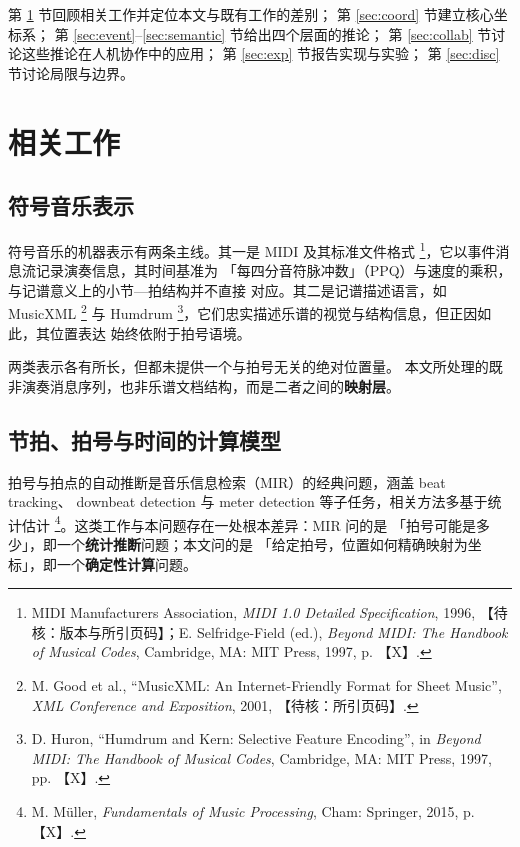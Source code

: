 \documentclass[11pt,a4paper,fontset=none]{ctexart}
\begin{document}
第 \ref{sec:related} 节回顾相关工作并定位本文与既有工作的差别；
第 \ref{sec:coord} 节建立核心坐标系；
第 \ref{sec:event}--\ref{sec:semantic} 节给出四个层面的推论；
第 \ref{sec:collab} 节讨论这些推论在人机协作中的应用；
第 \ref{sec:exp} 节报告实现与实验；
第 \ref{sec:disc} 节讨论局限与边界。

\section{相关工作}
\label{sec:related}
\subsection{符号音乐表示}

符号音乐的机器表示有两条主线。其一是 MIDI 及其标准文件格式
\footnote{MIDI Manufacturers Association, \emph{MIDI 1.0 Detailed Specification}, 1996, 【待核：版本与所引页码】；E. Selfridge-Field (ed.), \emph{Beyond MIDI: The Handbook of Musical Codes}, Cambridge, MA: MIT Press, 1997, p. 【X】.}，它以事件消息流记录演奏信息，其时间基准为
「每四分音符脉冲数」（PPQ）与速度的乘积，与记谱意义上的小节—拍结构并不直接
对应。其二是记谱描述语言，如 MusicXML \footnote{M. Good et al., “MusicXML: An Internet-Friendly Format for Sheet Music”, \emph{XML Conference and Exposition}, 2001, 【待核：所引页码】.} 与 Humdrum
\footnote{D. Huron, “Humdrum and Kern: Selective Feature Encoding”, in \emph{Beyond MIDI: The Handbook of Musical Codes}, Cambridge, MA: MIT Press, 1997, pp. 【X】.}，它们忠实描述乐谱的视觉与结构信息，但正因如此，其位置表达
始终依附于拍号语境。

\begin{注记}
两类表示各有所长，但都未提供一个与拍号无关的绝对位置量。
本文所处理的既非演奏消息序列，也非乐谱文档结构，而是二者之间的\textbf{映射层}。
\end{注记}

\subsection{节拍、拍号与时间的计算模型}

拍号与拍点的自动推断是音乐信息检索（MIR）的经典问题，涵盖 beat tracking、
downbeat detection 与 meter detection 等子任务，相关方法多基于统计估计
\footnote{M. Müller, \emph{Fundamentals of Music Processing}, Cham: Springer, 2015, p. 【X】.}。这类工作与本问题存在一处根本差异：MIR 问的是
「拍号可能是多少」，即一个\textbf{统计推断}问题；本文问的是
「给定拍号，位置如何精确映射为坐标」，即一个\textbf{确定性计算}问题。
\end{document}
